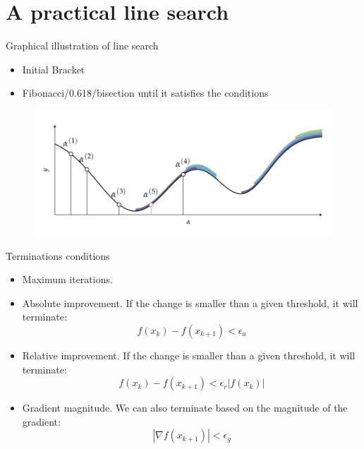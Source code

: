 \documentclass{beamer}
\begin{document}
\section{A practical line search}
\begin{frame}{Graphical illustration of line search}

\begin{itemize}
    \item Initial Bracket
    \item Fibonacci/0.618/bisection until it satisfies the conditions
\end{itemize}

\begin{figure}
\centering
\includegraphics[width=120mm]{Figs/linesearch.jpeg}
\end{figure}

\end{frame}

\begin{frame}{Terminations conditions}
\begin{itemize}
    \item Maximum iterations.
    \item Absolute improvement. If the change is smaller than a given threshold, it will terminate:
    \begin{equation*}
        f(x_k) - f(x_{k+1}) < \epsilon_a
    \end{equation*}
    
    \item Relative improvement. If the change is smaller than a given threshold, it will terminate:
    \begin{equation*}
        f(x_k) - f(x_{k+1}) < \epsilon_r |f(x_k)|
    \end{equation*}
    
    \item Gradient magnitude. We can also terminate based on the magnitude of the gradient:
        \begin{equation*}
            |\nabla f(x_{k+1})| < \epsilon_g 
        \end{equation*}
\end{itemize}

\end{frame}
\end{document}
